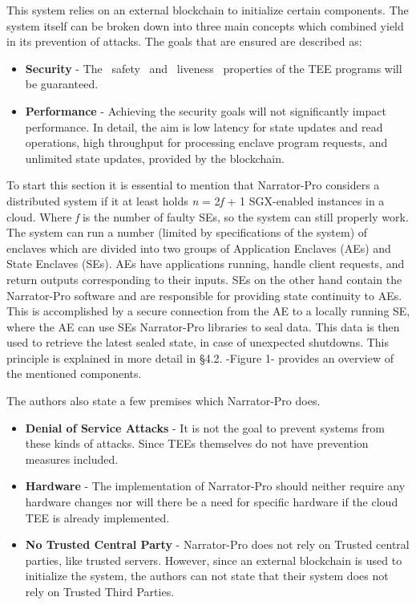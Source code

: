  

This system relies on an external blockchain to initialize certain components. The system itself can be broken down into three main concepts which combined yield in its prevention of attacks. The goals that are ensured are described as:
\begin{itemize}
     \item \textbf{Security} - The ~safety~ and ~liveness~ properties of the TEE programs will be guaranteed.
     \item \textbf{Performance} - Achieving the security goals will not significantly impact performance. In detail, the aim is low latency for state updates and read operations, high throughput for processing enclave program requests, and unlimited state updates, provided by the blockchain.
\end{itemize} 
To start this section it is essential to mention that Narrator-Pro considers a distributed system if it at least holds \textit{n} = 2\textit{f} + 1 SGX-enabled instances in a cloud. Where \textit{f} is the number of faulty SEs, so the system can still properly work. The system can run a number (limited by specifications of the system) of enclaves which are divided into two groups of Application Enclaves (AEs) and State Enclaves (SEs). AEs have applications running, handle client requests, and return outputs corresponding to their inputs. SEs on the other hand contain the Narrator-Pro software and are responsible for providing state continuity to AEs. This is accomplished by a secure connection from the AE to a locally running SE, where the AE can use SEs Narrator-Pro libraries to seal data. This data is then used to retrieve the latest sealed state, in case of unexpected shutdowns. This principle is explained in more detail in §4.2. -Figure 1- provides an overview of the mentioned components.

The authors also state a few premises which Narrator-Pro does. 
\begin{itemize}
    \item \textbf{Denial of Service Attacks} - It is not the goal to prevent systems from these kinds of attacks. Since TEEs themselves do not have prevention measures included.  
    \item \textbf{Hardware} - The implementation of Narrator-Pro should neither require any hardware changes nor will there be a need for specific hardware if the cloud TEE is already implemented.  
    \item \textbf{No Trusted Central Party} - Narrator-Pro does not rely on Trusted central parties, like trusted servers. However, since an external blockchain is used to initialize the system, the authors can not state that their system does not rely on Trusted Third Parties.
\end{itemize} 

